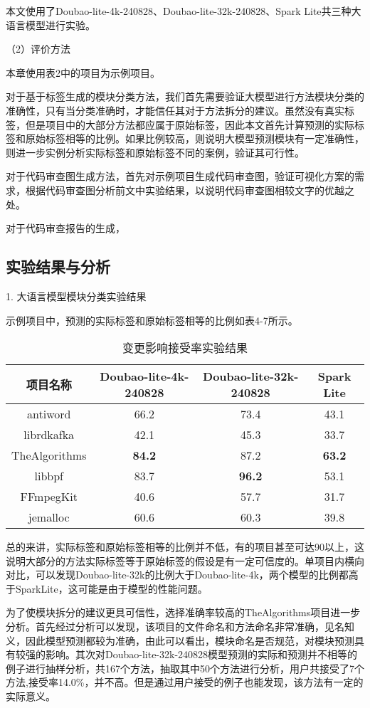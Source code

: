 本文使用了Doubao-lite-4k-240828、Doubao-lite-32k-240828、Spark Lite共三种大语言模型进行实验。

（2）评价方法

本章使用表2中的项目为示例项目。

对于基于标签生成的模块分类方法，我们首先需要验证大模型进行方法模块分类的准确性，只有当分类准确时，才能信任其对于方法拆分的建议。虽然没有真实标签，但是项目中的大部分方法都应属于原始标签，因此本文首先计算预测的实际标签和原始标签相等的比例。如果比例较高，则说明大模型预测模块有一定准确性，则进一步实例分析实际标签和原始标签不同的案例，验证其可行性。

对于代码审查图生成方法，首先对示例项目生成代码审查图，验证可视化方案的需求，根据代码审查图分析前文中实验结果，以说明代码审查图相较文字的优越之处。

对于代码审查报告的生成，

\subsection{实验结果与分析}

1. 大语言模型模块分类实验结果

示例项目中，预测的实际标签和原始标签相等的比例如表4-7所示。


\begin{table}[htbp]
\caption{变更影响接受率实验结果}
\vspace{0.5em}\centering\wuhao
\begin{tabular}{cccc}
\toprule
项目名称 & Doubao-lite-4k-240828 & Doubao-lite-32k-240828 & Spark Lite \\
\midrule
antiword & 66.2 & 73.4 & 43.1 \\
librdkafka & 42.1 & 45.3 & 33.7 \\
TheAlgorithms & \textbf{84.2} & 87.2 & \textbf{63.2} \\
libbpf & 83.7 & \textbf{96.2} & 53.1 \\
FFmpegKit & 40.6 & 57.7 & 31.7 \\
jemalloc & 60.6 & 60.3 & 39.8 \\
\bottomrule
\end{tabular}
\end{table}

总的来讲，实际标签和原始标签相等的比例并不低，有的项目甚至可达90以上，这说明大部分的方法实际标签等于原始标签的假设是有一定可信度的。单项目内横向对比，可以发现Doubao-lite-32k的比例大于Doubao-lite-4k，两个模型的比例都高于SparkLite，这可能是由于模型的性能问题。

为了使模块拆分的建议更具可信性，选择准确率较高的TheAlgorithms项目进一步分析。首先经过分析可以发现，该项目的文件命名和方法命名非常准确，见名知义，因此模型预测都较为准确，由此可以看出，模块命名是否规范，对模块预测具有较强的影响。其次对Doubao-lite-32k-240828模型预测的实际和预测并不相等的例子进行抽样分析，共167个方法，抽取其中50个方法进行分析，用户共接受了7个方法,接受率14.0\%，并不高。但是通过用户接受的例子也能发现，该方法有一定的实际意义。

